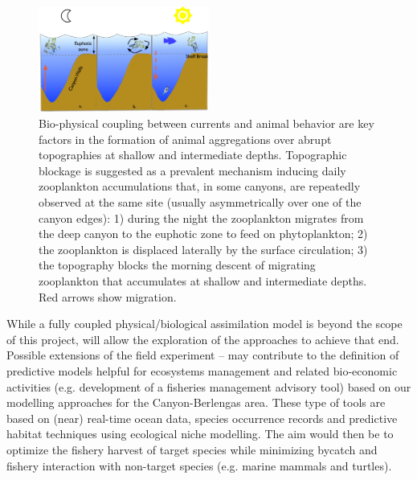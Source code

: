 \begin{figure}
  \vspace{-0.5cm}
  \centering
  \includegraphics[width=0.5\textwidth]{fig/plankton-canyon.jpg}
  \caption{Bio-physical coupling between currents and animal behavior
    are key factors in the formation of animal aggregations over
    abrupt topographies at shallow and intermediate
    depths. Topographic blockage is suggested as a prevalent mechanism
    inducing daily zooplankton accumulations that, in some canyons,
    are repeatedly observed at the same site (usually asymmetrically
    over one of the canyon edges): 1) during the night the zooplankton
    migrates from the deep canyon to the euphotic zone to feed on
    phytoplankton; 2) the zooplankton is displaced laterally by the
    surface circulation; 3) the topography blocks the morning descent
    of migrating zooplankton that accumulates at shallow and
    intermediate depths.  Red arrows show migration.}
  \label{fig:plankton}
\end{figure}

While a fully coupled physical/biological assimilation model is beyond
the scope of this project, \proj will allow the exploration of the
approaches to achieve that end.  Possible extensions of the field
experiment – may contribute to the definition of predictive models
helpful for ecosystems management and related bio-economic activities
(e.g. development of a fisheries management advisory tool) based on
our modelling approaches for the \naz Canyon-Berlengas area. These
type of tools are based on (near) real-time ocean data, species
occurrence records and predictive habitat techniques using ecological
niche modelling. The aim would then be to optimize the fishery harvest
of target species while minimizing bycatch and fishery interaction
with non-target species (e.g. marine mammals and turtles).


